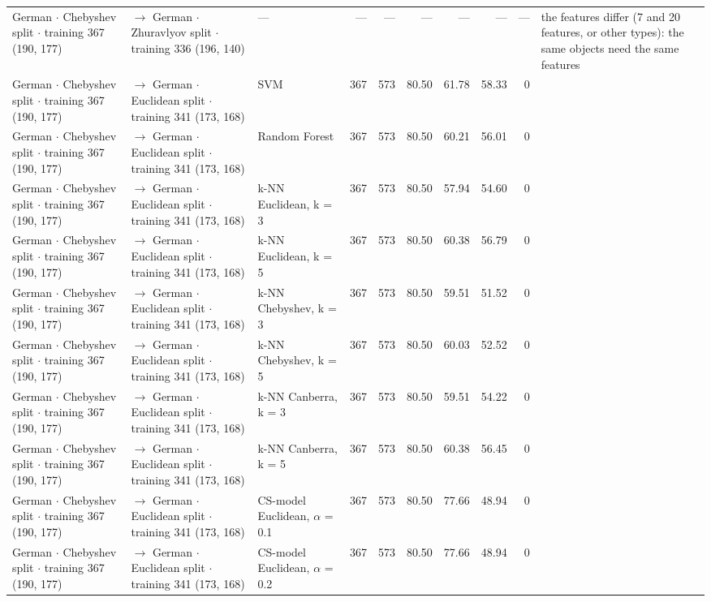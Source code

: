 \begin{table}[htbp]
\begin{tabular}{lllrrrrrrl}
    German $\cdot$ Chebyshev split $\cdot$ training 367 (190, 177) & $\to$ German $\cdot$ Zhuravlyov split $\cdot$ training 336 (196, 140) & --- & --- & --- & --- & --- & --- & --- & the features differ (7 and 20 features, or other types): the same objects need the same features \\
    German $\cdot$ Chebyshev split $\cdot$ training 367 (190, 177) & $\to$ German $\cdot$ Euclidean split $\cdot$ training 341 (173, 168) & SVM & 367 & 573 & 80.50 & 61.78 & 58.33 & 0 &  \\
    German $\cdot$ Chebyshev split $\cdot$ training 367 (190, 177) & $\to$ German $\cdot$ Euclidean split $\cdot$ training 341 (173, 168) & Random Forest & 367 & 573 & 80.50 & 60.21 & 56.01 & 0 &  \\
    German $\cdot$ Chebyshev split $\cdot$ training 367 (190, 177) & $\to$ German $\cdot$ Euclidean split $\cdot$ training 341 (173, 168) & k-NN Euclidean, k = 3 & 367 & 573 & 80.50 & 57.94 & 54.60 & 0 &  \\
    German $\cdot$ Chebyshev split $\cdot$ training 367 (190, 177) & $\to$ German $\cdot$ Euclidean split $\cdot$ training 341 (173, 168) & k-NN Euclidean, k = 5 & 367 & 573 & 80.50 & 60.38 & 56.79 & 0 &  \\
    German $\cdot$ Chebyshev split $\cdot$ training 367 (190, 177) & $\to$ German $\cdot$ Euclidean split $\cdot$ training 341 (173, 168) & k-NN Chebyshev, k = 3 & 367 & 573 & 80.50 & 59.51 & 51.52 & 0 &  \\
    German $\cdot$ Chebyshev split $\cdot$ training 367 (190, 177) & $\to$ German $\cdot$ Euclidean split $\cdot$ training 341 (173, 168) & k-NN Chebyshev, k = 5 & 367 & 573 & 80.50 & 60.03 & 52.52 & 0 &  \\
    German $\cdot$ Chebyshev split $\cdot$ training 367 (190, 177) & $\to$ German $\cdot$ Euclidean split $\cdot$ training 341 (173, 168) & k-NN Canberra, k = 3 & 367 & 573 & 80.50 & 59.51 & 54.22 & 0 &  \\
    German $\cdot$ Chebyshev split $\cdot$ training 367 (190, 177) & $\to$ German $\cdot$ Euclidean split $\cdot$ training 341 (173, 168) & k-NN Canberra, k = 5 & 367 & 573 & 80.50 & 60.38 & 56.45 & 0 &  \\
    German $\cdot$ Chebyshev split $\cdot$ training 367 (190, 177) & $\to$ German $\cdot$ Euclidean split $\cdot$ training 341 (173, 168) & CS-model Euclidean, $\alpha$ = 0.1 & 367 & 573 & 80.50 & 77.66 & 48.94 & 0 &  \\
    German $\cdot$ Chebyshev split $\cdot$ training 367 (190, 177) & $\to$ German $\cdot$ Euclidean split $\cdot$ training 341 (173, 168) & CS-model Euclidean, $\alpha$ = 0.2 & 367 & 573 & 80.50 & 77.66 & 48.94 & 0 &  \\

\end{tabular}
\end{table}
